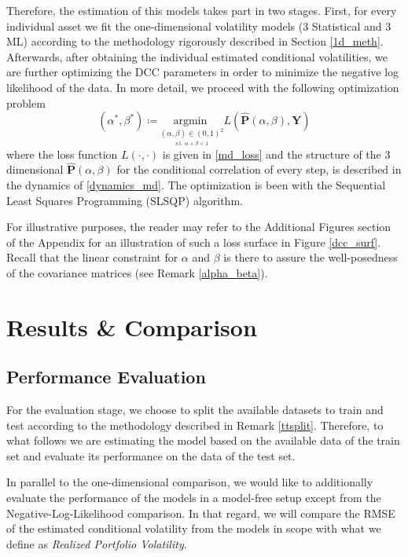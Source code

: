 \documentclass[a4paper, oneside]{discothesis}
\begin{document}
Therefore, the estimation of this models takes part in two stages. First, for every individual asset we fit the one-dimensional volatility models (3 Statistical and 3 ML) according to the methodology rigorously described in Section \ref{1d_meth}. Afterwards, after obtaining the individual estimated conditional volatilities, we are further optimizing the DCC parameters in order to minimize the negative log likelihood of the data. In more detail, we proceed with the following optimization problem
\begin{equation}
    (\alpha^*, \beta^*)\coloneqq \underset{\underset{\text{s.t. } \alpha+\beta<1}{(\alpha, \beta)\in (0,1)^2}}{\text{argmin   }} L\left(\mathbf{\hat{P}}(\alpha, \beta), \mathbf{Y}\right)
\end{equation}
 where the loss function $L\left(\cdot, \cdot\right)$ is given in \ref{md_loss} and the structure of the 3 dimensional $\mathbf{\hat{P}}(\alpha, \beta)$ for the conditional correlation of every step, is described in the dynamics of \ref{dynamics_md}. The optimization is been with the Sequential Least Squares Programming (SLSQP) algorithm.
 
 For illustrative purposes, the reader may refer to the Additional Figures section of the Appendix for an illustration of such a loss surface in Figure \ref{dcc_surf}. Recall that the linear constraint for $\alpha$ and $\beta$ is there to assure the well-posedness of the covariance matrices (see Remark \ref{alpha_beta}).

\section{Results \& Comparison}
\subsection{Performance Evaluation}
For the evaluation stage, we choose to split the available datasets to train and test according to the methodology described in Remark \ref{ttsplit}. Therefore, to what follows we are estimating the model based on the available data of the train set and evaluate its performance on the data of the test set.

In parallel to the one-dimensional comparison, we would like to additionally evaluate the performance of the models in a model-free setup except from the Negative-Log-Likelihood comparison. In that regard, we will compare the RMSE of the estimated conditional volatility from the models in scope with what we define as \textit{Realized Portfolio Volatility}. 
\end{document}
